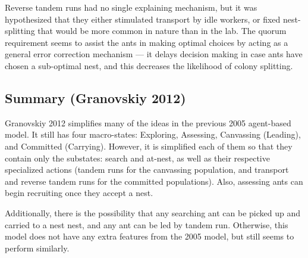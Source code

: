 \documentclass{article}
\begin{document}
Reverse tandem runs had no single explaining mechanism, but it was hypothesized that they either stimulated transport by idle workers, or fixed nest-splitting that would be more common in nature than in the lab.
The quorum requirement seems to assist the ants in making optimal choices by acting as a general error correction mechanism --- it delays decision making in case ants have chosen a sub-optimal nest, and this decreases the likelihood of colony splitting.

\subsection{Summary (Granovskiy 2012)}

Granovskiy 2012 simplifies many of the ideas in the previous 2005 agent-based model.
It still has four macro-states: Exploring, Assessing, Canvassing (Leading), and Committed (Carrying).
However, it is simplified each of them so that they contain only the substates: search and at-nest, as well as their respective specialized actions (tandem runs for the canvassing population, and transport and reverse tandem runs for the committed populations). 
Also, assessing ants can begin recruiting once they accept a nest.

Additionally, there is the possibility that any searching ant can be picked up and carried to a nest nest, and any ant can be led by tandem run.
Otherwise, this model does not have any extra features from the 2005 model, but still seems to perform similarly.
\end{document}

